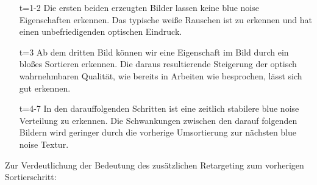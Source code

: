 \begin{itemize}
    \item[t=1-2] Die ersten beiden erzeugten Bilder lassen keine blue noise Eigenschaften erkennen.
                    Das typische weiße Rauschen ist zu erkennen und hat einen unbefriedigenden optischen Eindruck.
                     \par 
                    
    \item[t=3] Ab dem dritten Bild können wir eine  Eigenschaft im Bild durch ein 
                bloßes Sortieren erkennen. Die daraus resultierende Steigerung der optisch wahrnehmbaren 
                Qualität, wie bereits in Arbeiten wie \cite{3288} besprochen, lässt sich gut erkennen. 
    \item[t=4-7] In den darauffolgenden Schritten ist eine zeitlich stabilere blue noise Verteilung zu erkennen.
                 Die Schwankungen zwischen den darauf folgenden Bildern wird geringer durch die vorherige 
                 Umsortierung zur nächsten blue noise Textur. 
\end{itemize}


Zur Verdeutlichung der Bedeutung des zusätzlichen Retargeting zum vorherigen Sortierschritt:

